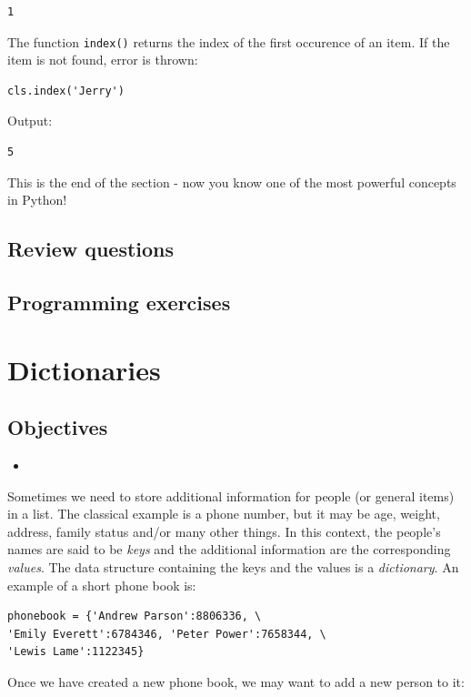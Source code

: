\begin{verbatim}
1
\end{verbatim}
The function {\tt index()} returns the index of the first occurence 
of an item. If the item is not found, error is thrown:

\begin{verbatim}
cls.index('Jerry')
\end{verbatim}
Output:

\begin{verbatim}
5
\end{verbatim}
This is the end of the section - now you know one of the most powerful 
concepts in Python!

\subsection{Review questions}

\subsection{Programming exercises}


\section{Dictionaries}

\subsection{Objectives}

\begin{itemize}
\item
\end{itemize}

Sometimes we need to store additional information for 
people (or general items) in a list. The classical example is 
a phone number, but it may be age, weight, address, family 
status and/or many other things. In this context, the 
people's names are said to be {\em keys} and the additional 
information are the corresponding {\em values}. The data structure
containing the keys and the values is a {\em dictionary}. An
example of a short phone book is:

\begin{verbatim}
phonebook = {'Andrew Parson':8806336, \
'Emily Everett':6784346, 'Peter Power':7658344, \
'Lewis Lame':1122345}
\end{verbatim}
Once we have created a new phone book, we may want to add a new person to it:

